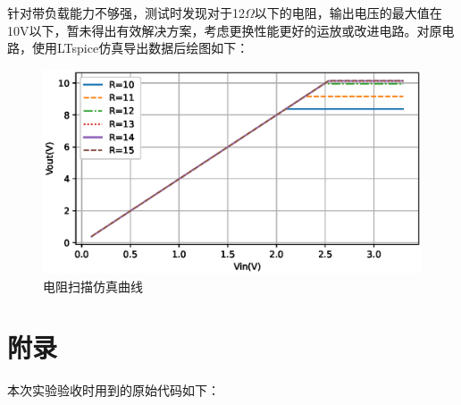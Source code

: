 \documentclass[a4paper]{article}
\newcommand{\sectionbreak}{\clearpage} %
\theoremstyle{definition}
\theoremstyle{plain}
\theoremstyle{remark}
\begin{document}
针对带负载能力不够强，测试时发现对于12$\Omega$以下的电阻，输出电压的最大值在10V以下，暂未得出有效解决方案，考虑更换性能更好的运放或改进电路。对原电路，使用LTspice仿真导出数据后绘图如下：
\begin{figure}[H]
	\centering
	\includegraphics[width=1\textwidth]{电阻扫描}
	\caption{电阻扫描仿真曲线}
\end{figure}



\sectionbreak


\clearpage
\appendix
{}
{}
\section*{附录}
本次实验验收时用到的原始代码如下：
\end{document}
